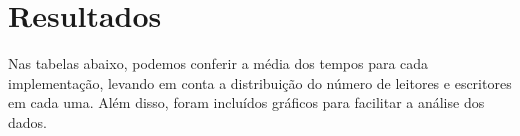 \documentclass[
	12pt,				%
	oneside,			%
	a4paper,			%
	english,			%
	brazil				%
	]{abntex2ppgsi}
\begin{document}
\frenchspacing 


%
% 
%
\imprimircapa

\tableofcontents*
\cleardoublepage



\textual



% 
%
%
\chapter{Resultados}
Nas tabelas abaixo, podemos conferir a média dos tempos para cada implementação, levando em conta a distribuição do número de leitores e escritores em cada uma. Além disso, foram incluídos gráficos para facilitar a análise dos dados.
\end{document}
